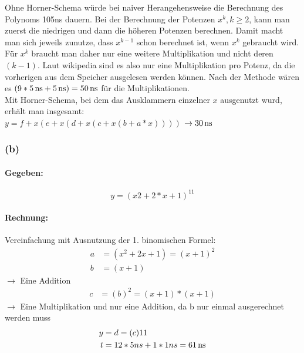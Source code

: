 \documentclass[11pt,a4paper]{article}
\begin{document}
Ohne Horner-Schema würde bei naiver Herangehensweise die Berechnung des Polynoms 105ns dauern.
Bei der Berechnung der Potenzen $x^k, k\geq2$, kann man zuerst die niedrigen und dann die höheren Potenzen berechnen. Damit macht man sich jeweils zunutze, dass $x^{k-1}$ schon berechnet ist, wenn $x^{k}$ gebraucht wird. Für $x^{k}$ braucht man daher nur eine weitere Multiplikation und nicht deren $(k-1)$.
Laut wikipedia sind es also nur eine Multiplikation pro Potenz, da die vorherigen aus dem Speicher ausgelesen werden können\cite{wiki:1}.
Nach der Methode wären es $(9*\unit[5]{ns} + \unit[5]{ns}) = \unit[50]{ns}$ für die Multiplikationen.\\

Mit Horner-Schema, bei dem das Ausklammern einzelner $x$ ausgenutzt wurd, erhält man insgesamt:\\
$y = f + x (e + x ( d + x ( c + x ( b + a * x ))))$
$\rightarrow \unit[30]{ns}$

\newpage

\subsubsection{(b)} %

\paragraph{Gegeben:}
\begin{equation}
y = (x2+2*x+1)^{11}
\end{equation}

\paragraph{Rechnung:}

Vereinfachung mit Ausnutzung der 1. binomischen Formel:
\begin{align}
a &= (x^2+2x+1)=(x+1)^2\\
b &= (x+1)
\end{align}
$\rightarrow$ Eine Addition
\begin{align}
c &= (b)^2=(x+1)*(x+1)
\end{align}
$\rightarrow$ Eine Multiplikation und nur eine Addition, da b nur einmal ausgerechnet werden muss\\
\begin{align}
y &= d=(c)11\\
t &= 12*5ns + 1*1ns = \unit[61]{ns}
\end{align}
\end{document}
